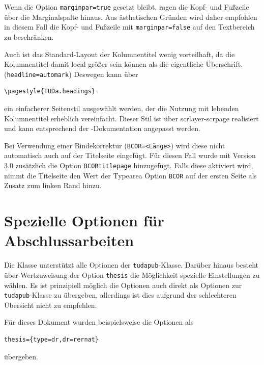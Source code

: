 \documentclass[
	german,%
	accentcolor=9c,%
	ruledheaders=section,%
	class=report,%
	thesis={type=bachelor},%
	fontsize=11pt,%
	parskip=half-,%
	custommargins=true,%
	marginpar=false,%
]{tudapub}
\newcommand*{\file}[1]{\texttt{#1}}
\newcommand*{\code}[1]{\texttt{#1}}
\newcommand*{\pkg}[1]{\textsf{#1}}
\begin{document}
Wenn die Option \code{marginpar=true} gesetzt bleibt, ragen die Kopf- und Fußzeile über die Marginalspalte hinaus. Aus ästhetischen Gründen wird daher empfohlen in diesem Fall die Kopf- und Fußzeile  mit \code{marginpar=false}  auf den Textbereich zu beschränken.

Auch ist das Standard-Layout der Kolumnentitel wenig vorteilhaft, da die Kolumnentitel damit local größer sein können als die eigentliche Überschrift. (\code{headline=automark})
Deswegen kann über
\begin{verbatim}
\pagestyle{TUDa.headings}
\end{verbatim}
ein einfacherer Seitenstil ausgewählt werden, der die Nutzung mit lebenden Kolumnentitel erheblich vereinfacht. Dieser Stil ist über \pkg{scrlayer-scrpage} realisiert und kann entsprechend der \KOMAScript{}-Dokumentation angepasst werden.

Bei Verwendung einer Bindekorrektur (\code{BCOR=<Länge>}) wird diese nicht automatisch auch auf der Titelseite eingefügt. Für diesen Fall wurde mit Version 3.0 zusätzlich die Option \code{BCORtitlepage} hinzugefügt. Falls diese aktiviert wird, nimmt die Titelseite den Wert der Typearea Option \code{BCOR} auf der ersten Seite als Zusatz zum linken Rand hinzu.

\section{Spezielle Optionen für Abschlussarbeiten}
Die Klasse unterstützt alle Optionen der \file{tudapub}-Klasse. Darüber hinaus besteht über Wertzuweisung der Option \code{thesis} die Möglichkeit spezielle Einstellungen zu wählen.
Es ist prinzipiell möglich die Optionen auch direkt als Optionen zur \file{tudapub}-Klasse zu übergeben, allerdings ist dies aufgrund der schlechteren Übersicht nicht zu empfehlen.

Für dieses Dokument wurden beispielsweise die Optionen als
\begin{verbatim}
thesis={type=dr,dr=rernat}
\end{verbatim}
übergeben.
\end{document}

